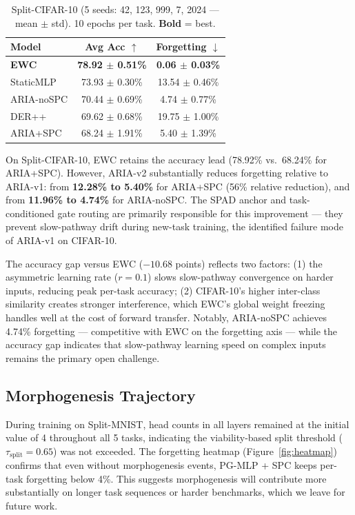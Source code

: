 \documentclass[10pt,twocolumn]{article}
\begin{document}
\begin{table}[h]
\centering
\caption{Split-CIFAR-10 (5 seeds: 42, 123, 999, 7, 2024 --- mean $\pm$ std). 10 epochs per task. \textbf{Bold} = best.}
\label{tab:cifar}
\begin{tabular}{lcc}
\toprule
Model           & Avg Acc $\uparrow$           & Forgetting $\downarrow$     \\
\midrule
\textbf{EWC}    & \textbf{78.92 $\pm$ 0.51\%} & \textbf{0.06 $\pm$ 0.03\%} \\
StaticMLP       & 73.93 $\pm$ 0.30\%          & 13.54 $\pm$ 0.46\%         \\
ARIA-noSPC      & 70.44 $\pm$ 0.69\%          & 4.74 $\pm$ 0.77\%          \\
DER++           & 69.62 $\pm$ 0.68\%          & 19.75 $\pm$ 1.00\%         \\
ARIA+SPC        & 68.24 $\pm$ 1.91\%          & 5.40 $\pm$ 1.39\%          \\
\bottomrule
\end{tabular}
\end{table}

On Split-CIFAR-10, EWC retains the accuracy lead (78.92\% vs.\ 68.24\% for ARIA+SPC).
However, ARIA-v2 substantially reduces forgetting relative to ARIA-v1: from \textbf{12.28\%
to 5.40\%} for ARIA+SPC (56\% relative reduction), and from \textbf{11.96\% to 4.74\%}
for ARIA-noSPC. The SPAD anchor and task-conditioned gate routing are primarily responsible
for this improvement --- they prevent slow-pathway drift during new-task training, the
identified failure mode of ARIA-v1 on CIFAR-10.

The accuracy gap versus EWC ($-10.68$ points) reflects two factors: (1) the asymmetric
learning rate ($r=0.1$) slows slow-pathway convergence on harder inputs, reducing peak
per-task accuracy; (2) CIFAR-10's higher inter-class similarity creates stronger
interference, which EWC's global weight freezing handles well at the cost of forward
transfer. Notably, ARIA-noSPC achieves 4.74\% forgetting --- competitive with EWC on the
forgetting axis --- while the accuracy gap indicates that slow-pathway learning speed
on complex inputs remains the primary open challenge.

\subsection{Morphogenesis Trajectory}

During training on Split-MNIST, head counts in all layers remained at the initial
value of 4 throughout all 5 tasks, indicating the viability-based split threshold
($\tau_{\mathrm{split}} = 0.65$) was not exceeded. The forgetting heatmap
(Figure~\ref{fig:heatmap}) confirms that even without morphogenesis events,
PG-MLP + SPC keeps per-task forgetting below 4\%. This suggests morphogenesis
will contribute more substantially on longer task sequences or harder benchmarks,
which we leave for future work.
\end{document}
